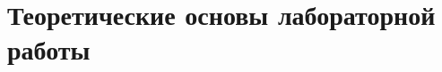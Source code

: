 \documentclass[../main/main.tex]{subfiles}
\begin{document}
    \newpage
    \section{Теоретические основы лабораторной работы}
    \label{sec:methods}
\end{document}
